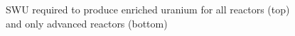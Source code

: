 \begin{frame}
\begin{columns}
\begin{figure}
\begin{subfigure}
                \label{fig:swu_haleu}
            \end{subfigure}
            \caption{\gls{SWU} required to produce enriched uranium for all 
            reactors (top) and only advanced reactors (bottom)}
            \label{fig:swu}
        \end{figure}
    \end{columns}
    

\end{frame}

